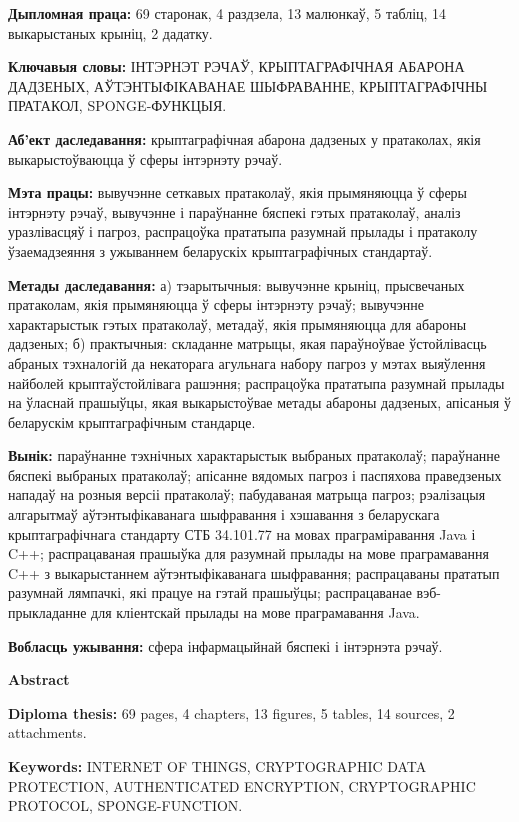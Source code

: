 \textbf{Дыпломная праца:} 69 старонак, 4 раздзела, 13 малюнкаў, 5 табліц, 14 выкарыстаных крыніц,
2 дадатку.

\textbf{Ключавыя словы:} ІНТЭРНЭТ РЭЧАЎ, КРЫПТАГРАФІЧНАЯ АБАРОНА ДАДЗЕНЫХ, АЎТЭНТЫФІКАВАНАЕ 
ШЫФРАВАННЕ, КРЫПТАГРАФІЧНЫ ПРАТАКОЛ, SPONGE-ФУНКЦЫЯ.

\textbf{Аб'ект даследавання:} крыптаграфічная абарона дадзеных у пратаколах, якія выкарыстоўваюцца 
ў сферы інтэрнэту рэчаў.

\textbf{Мэта працы:} вывучэнне сеткавых пратаколаў, якія прымяняюцца ў сферы інтэрнэту рэчаў, вывучэнне 
і параўнанне бяспекі гэтых пратаколаў, аналіз уразлівасцяў і пагроз, распрацоўка прататыпа разумнай прылады 
і пратаколу ўзаемадзеяння з ужываннем беларускіх крыптаграфічных стандартаў.

\textbf{Метады даследавання:} а) тэарытычныя: вывучэнне крыніц, прысвечаных пратаколам, якія прымяняюцца 
ў сферы інтэрнэту рэчаў; вывучэнне характарыстык гэтых пратаколаў, метадаў, якія прымяняюцца для абароны 
дадзеных; б) практычныя: складанне матрыцы, якая параўноўвае ўстойлівасць абраных тэхналогій да некаторага 
агульнага набору пагроз у мэтах выяўлення найболей крыптаўстойлівага рашэння; распрацоўка прататыпа 
разумнай прылады на ўласнай прашыўцы, якая выкарыстоўвае метады абароны дадзеных, апісаныя ў беларускім 
крыптаграфічным стандарце.

\textbf{Вынік:} параўнанне тэхнічных характарыстык выбраных пратаколаў; параўнанне бяспекі выбраных пратаколаў; 
апісанне вядомых пагроз і паспяхова праведзеных нападаў на розныя версіі пратаколаў; пабудаваная матрыца пагроз; 
рэалізацыя алгарытмаў аўтэнтыфікаванага шыфравання і хэшавання з беларускага крыптаграфічнага стандарту 
СТБ 34.101.77 на мовах праграміравання Java і C++; распрацаваная прашыўка для разумнай прылады на мове 
праграмавання C++ з выкарыстаннем аўтэнтыфікаванага шыфравання; распрацаваны прататып разумнай лямпачкі, 
які працуе на гэтай прашыўцы; распрацаванае вэб-прыкладанне для кліентскай прылады на мове праграмавання Java.

\textbf{Вобласць ужывання:} сфера інфармацыйнай бяспекі і інтэрнэта рэчаў.


\newpage
\begin{center}{\bf \Large Abstract}\end{center}

\textbf{Diploma thesis:} 69 pages, 4 chapters, 13 figures, 5 tables, 14 sources, 2 attachments.

\textbf{Keywords:} INTERNET OF THINGS, CRYPTOGRAPHIC DATA \newline PROTECTION, 
AUTHENTICATED ENCRYPTION, CRYPTOGRAPHIC PROTOCOL, SPONGE-FUNCTION.

